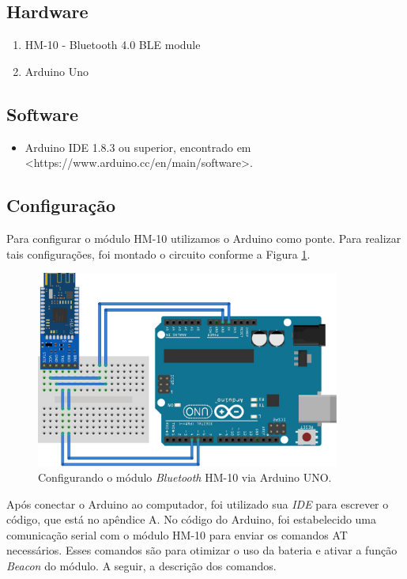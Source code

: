 \documentclass[
	12pt,				%
	oneside,			%
	a4paper,			%
	brazil				%
]{abntex2}
\begin{document}
\subsection{Hardware}

\begin{enumerate}
\item HM-10 - Bluetooth 4.0 BLE module
\item Arduino Uno
\end{enumerate}

\subsection{Software}

\begin{itemize}
\item Arduino IDE 1.8.3 ou superior, encontrado em <https://www.arduino.cc/en/main/software>. 
\end{itemize}

\subsection{Configuração}

Para configurar o módulo HM-10 utilizamos o Arduino como ponte. Para realizar tais configurações, foi montado o circuito conforme a Figura \ref{beacon}.

\begin{figure}[H]
\centering
\includegraphics[width=10cm, center]{images/arduino-hm10}
\caption{Configurando o módulo \textit{Bluetooth} HM-10 via Arduino UNO.}
\label{beacon}
\end{figure}

Após conectar o Arduino ao computador, foi utilizado sua \textit{IDE} para escrever o código, que está no apêndice A. No código do Arduino, foi estabelecido uma comunicação serial com o módulo HM-10 para enviar os comandos AT necessários. Esses comandos são para otimizar o uso da bateria e ativar a função \textit{Beacon} do módulo. A seguir, a descrição dos comandos.
\end{document}
